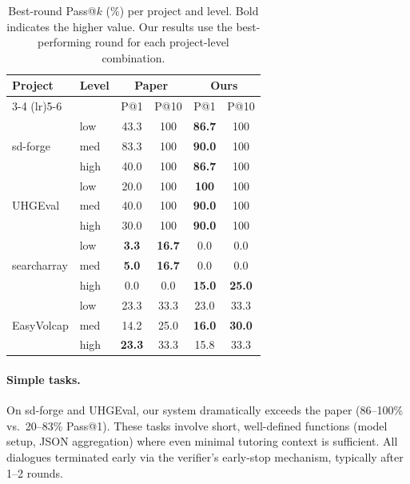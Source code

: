 \documentclass[11pt]{article}
\begin{document}
\begin{table}[t]
  \centering
  \small
  \begin{tabular}{llcccc}
    \toprule
    \textbf{Project} & \textbf{Level} & \multicolumn{2}{c}{\textbf{Paper}} & \multicolumn{2}{c}{\textbf{Ours}} \\
    \cmidrule(lr){3-4} \cmidrule(lr){5-6}
    & & P@1 & P@10 & P@1 & P@10 \\
    \midrule
    \multirow{3}{*}{sd-forge}
    & low  & 43.3 & 100 & \textbf{86.7} & 100 \\
    & med  & 83.3 & 100 & \textbf{90.0} & 100 \\
    & high & 40.0 & 100 & \textbf{86.7} & 100 \\
    \midrule
    \multirow{3}{*}{UHGEval}
    & low  & 20.0 & 100 & \textbf{100} & 100 \\
    & med  & 40.0 & 100 & \textbf{90.0} & 100 \\
    & high & 30.0 & 100 & \textbf{90.0} & 100 \\
    \midrule
    \multirow{3}{*}{searcharray}
    & low  & \textbf{3.3} & \textbf{16.7} & 0.0 & 0.0 \\
    & med  & \textbf{5.0} & \textbf{16.7} & 0.0 & 0.0 \\
    & high & 0.0 & 0.0 & \textbf{15.0} & \textbf{25.0} \\
    \midrule
    \multirow{3}{*}{EasyVolcap}
    & low  & 23.3 & 33.3 & 23.0 & 33.3 \\
    & med  & 14.2 & 25.0 & \textbf{16.0} & \textbf{30.0} \\
    & high & \textbf{23.3} & 33.3 & 15.8 & 33.3 \\
    \bottomrule
  \end{tabular}
  \caption{Best-round Pass@$k$ (\%) per project and level. Bold indicates the higher value. Our results use the best-performing round for each project-level combination.}
  \label{tab:results-per-project}
\end{table}

\paragraph{Simple tasks.} On sd-forge and UHGEval, our system dramatically exceeds the paper (86--100\% vs.\ 20--83\% Pass@1). These tasks involve short, well-defined functions (model setup, JSON aggregation) where even minimal tutoring context is sufficient. All dialogues terminated early via the verifier's early-stop mechanism, typically after 1--2 rounds.
\end{document}
